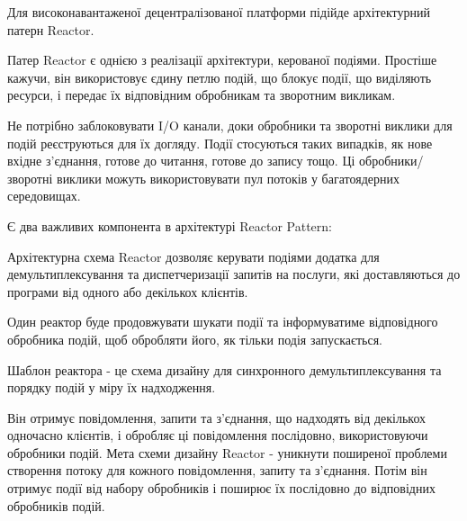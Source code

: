 \documentclass{lib/styles/default-style}
\begin{document}
    Для високонавантаженої децентралізованої платформи підійде архітектурний патерн Reactor.

    Патер Reactor є однією з реалізації архітектури, керованої подіями.
    Простіше кажучи, він використовує єдину петлю подій, що блокує події,
    що виділяють ресурси, і передає їх відповідним обробникам та зворотним викликам.

    Не потрібно заблоковувати I/O канали, доки обробники та зворотні виклики для подій реєструються для їх догляду.
    Події стосуються таких випадків, як нове вхідне з'єднання, готове до читання, готове до запису тощо.
    Ці обробники/зворотні виклики можуть використовувати пул потоків у багатоядерних середовищах.

    Є два важливих компонента в архітектурі Reactor Pattern:


    Архітектурна схема Reactor дозволяє керувати подіями додатка для демультиплексування та диспетчеризації запитів на послуги,
    які доставляються до програми від одного або декількох клієнтів.

    Один реактор буде продовжувати шукати події та інформуватиме відповідного обробника подій,
    щоб обробляти його, як тільки подія запускається.

    Шаблон реактора - це схема дизайну для синхронного демультиплексування та порядку подій у міру їх
    надходження.

    Він отримує повідомлення, запити та з'єднання, що надходять від декількох одночасно клієнтів, і обробляє ці
    повідомлення послідовно, використовуючи обробники подій. Мета схеми дизайну Reactor -
    уникнути поширеної проблеми створення потоку для кожного повідомлення, запиту та з'єднання.
    Потім він отримує події від набору обробників і поширює їх послідовно до відповідних обробників подій.
\end{document}
